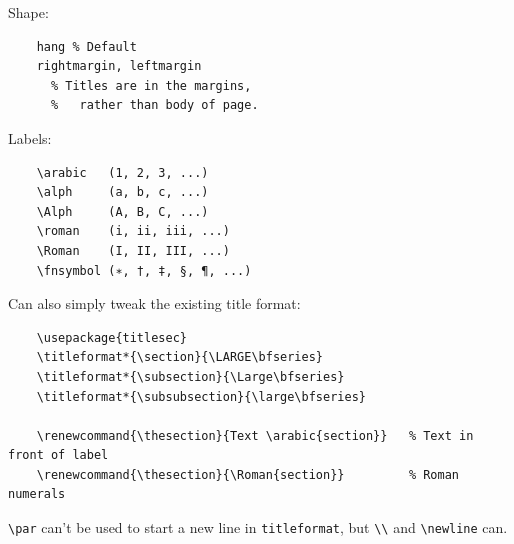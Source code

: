 \documentclass{article}
\begin{document}
\begin{minipage}{0.5\textwidth}
Shape:
\begin{lstlisting}
    hang % Default
    rightmargin, leftmargin
      % Titles are in the margins,
      %   rather than body of page.
\end{lstlisting}
\end{minipage}%
\begin{minipage}{0.5\textwidth}
Labels:
\begin{lstlisting}
    \arabic   (1, 2, 3, ...)
    \alph     (a, b, c, ...)
    \Alph     (A, B, C, ...)
    \roman    (i, ii, iii, ...)
    \Roman    (I, II, III, ...)
    \fnsymbol (∗, †, ‡, §, ¶, ...)
\end{lstlisting}
\end{minipage}

Can also simply tweak the existing title format:
\begin{lstlisting}
    \usepackage{titlesec}
    \titleformat*{\section}{\LARGE\bfseries}
    \titleformat*{\subsection}{\Large\bfseries}
    \titleformat*{\subsubsection}{\large\bfseries}

    \renewcommand{\thesection}{Text \arabic{section}}   % Text in front of label
    \renewcommand{\thesection}{\Roman{section}}         % Roman numerals
\end{lstlisting}

\verb|\par| can't be used to start a new line in \verb|titleformat|, but
\verb|\\| and
\verb|\newline| can.
\end{document}
